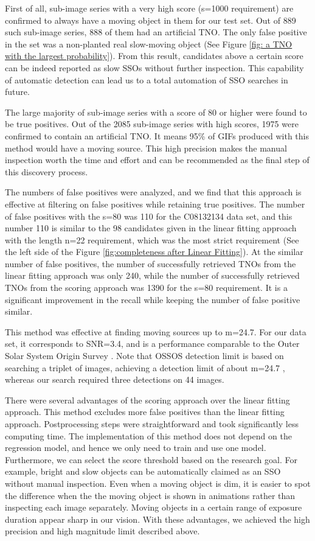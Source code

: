 First of all, sub-image series with a very high score (s=1000 requirement) are confirmed to always have a moving object in them for our test set.
Out of 889 such sub-image series, 888 of them had an artificial TNO.
The only false positive in the set was a non-planted real slow-moving object (See Figure \ref{fig: a TNO with the largest probability}). 
From this result, candidates above a certain score can be indeed reported as slow SSOs without further inspection.
This capability of automatic detection can lead us to a total automation of SSO searches in future.

The large majority of sub-image series with a score of 80 or higher were found to be true positives.
Out of the 2085 sub-image series with high scores, 1975 were confirmed to contain an artificial TNO.
It means 95\% of GIFs produced with this method would have a moving source.
This high precision makes the manual inspection worth the time and effort and can be recommended as the final step of this discovery process.

The numbers of false positives were analyzed, and we find that this approach is effective at filtering on false positives while retaining true positives.
The number of false positives with the s=80 was 110 for the C08132134 data set, and this number 110 is similar to the 98 candidates given in the linear fitting approach with the length n=22 requirement, which was the most strict requirement (See the left side of the Figure \ref{fig:completeness after Linear Fitting}).
At the similar number of false positives, the number of successfully retrieved TNOs from the linear fitting approach was only 240, while the number of successfully retrieved TNOs from the scoring approach was 1390 for the s=80 requirement.
It is a significant improvement in the recall while keeping the number of false positive similar.

This method was effective at finding moving sources up to m=24.7.
For our data set, it corresponds to SNR=3.4, and is a performance comparable to the Outer Solar System Origin Survey \citep{2016AJ....152...70B}.
Note that OSSOS detection limit is based on searching a triplet of images, achieving a detection limit of about m=24.7 \citep{2018ApJS..236...18B}, whereas our search required three detections on 44 images.

There were several advantages of the scoring approach over the linear fitting approach.
This method excludes more false positives than the linear fitting approach.
Postprocessing steps were straightforward and took significantly less computing time.
The implementation of this method does not depend on the regression model, and hence we only need to train and use one model.
Furthermore, we can select the score threshold based on the research goal.
For example, bright and slow objects can be automatically claimed as an SSO without manual inspection.
Even when a moving object is dim, it is easier to spot the difference when the the moving object is shown in animations rather than inspecting each image separately.
Moving objects in a certain range of exposure duration appear sharp in our vision. \citep{1997Burr}
With these advantages, we achieved the high precision and high magnitude limit described above.

